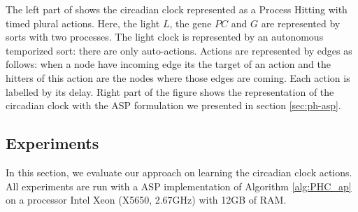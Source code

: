The left part of  shows the circadian clock represented as a Process Hitting with timed plural actions.
Here, the light $L$, the gene $PC$ and $G$ are represented by sorts with two processes.
The light clock is represented by an autonomous temporized sort: there are only auto-actions.
Actions are represented by edges as follows: when a node have incoming edge its the target of an action and the hitters of this action are the nodes where those edges are coming.
Each action is labelled by its delay.
Right part of the figure shows the representation of the circadian clock with the ASP formulation we presented in section \ref{sec:ph-asp}.



\subsection{Experiments}

In this section, we evaluate our approach on learning the circadian clock actions.
All experiments are run with a ASP implementation of Algorithm \ref{alg:PHC_ap} on a processor Intel Xeon (X5650, 2.67GHz) with 12GB of RAM.

